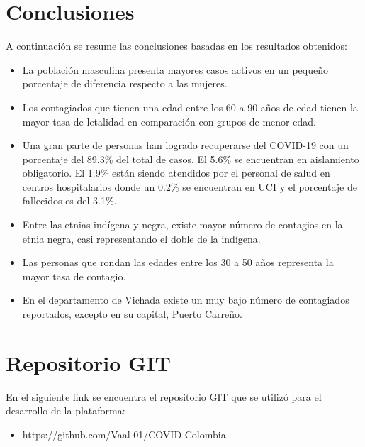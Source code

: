 \documentclass[conference,compsoc,onecolumn]{IEEEtran}
\begin{document}
\label{sec:results}




\section{Conclusiones}
A continuación se resume las conclusiones basadas en los resultados obtenidos: 
\label{sec:conclusions}
\begin{itemize}
    
    \item La población masculina presenta mayores casos activos en un pequeño porcentaje de diferencia respecto a las mujeres.
    \item Los contagiados que tienen una edad entre los 60 a 90 años de edad tienen la mayor tasa de letalidad en comparación con grupos de menor edad. 
    \item Una gran parte de personas han logrado recuperarse del COVID-19 con un porcentaje del 89.3\% del total de casos. El 5.6\% se encuentran en aislamiento obligatorio. El 1.9\% están siendo atendidos por el personal de salud en centros hospitalarios donde un 0.2\% se encuentran en UCI y el porcentaje de fallecidos es del 3.1\%.
    \item Entre las etnias indígena y negra, existe mayor número de contagios en la etnia negra, casi representando el doble de la indígena.
    \item Las personas que rondan las edades entre los 30 a 50 años representa la mayor tasa de contagio.
    \item En el departamento de Vichada existe un muy bajo número de contagiados reportados, excepto en su capital, Puerto Carreño.
    
\end{itemize}

\section{Repositorio GIT}
En el siguiente link se encuentra el repositorio GIT que se utilizó para el desarrollo de la plataforma:
\begin{itemize}
\item https://github.com/Vaal-01/COVID-Colombia
\end{itemize}

\nocite{*}

\label{sec:biblio}
 





\end{document}

